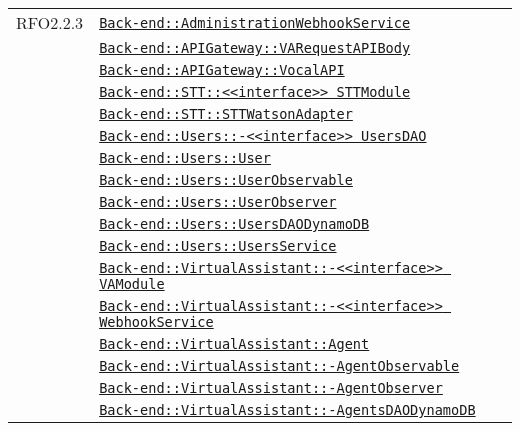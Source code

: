 \begin{longtable}{|>{\centering}m{3cm}|m{10cm}<{\centering}|}
RFO2.2.3 & \hyperref[Back-end::AdministrationWebhookService]{\texttt{Back-end::AdministrationWebhookService}}\\
& \hyperref[Back-end::APIGateway::VARequestAPIBody]{\texttt{Back-end::APIGateway::VARequestAPIBody}}\\
& \hyperref[Back-end::APIGateway::VocalAPI]{\texttt{Back-end::APIGateway::VocalAPI}}\\
& \hyperref[Back-end::STT::<<interface>> STTModule]{\texttt{Back-end::STT::<<interface>> STTModule}}\\
& \hyperref[Back-end::STT::STTWatsonAdapter]{\texttt{Back-end::STT::STTWatsonAdapter}}\\
& \hyperref[Back-end::Users::<<interface>> UsersDAO]{\texttt{Back-end::Users::-\linebreak <<interface>> UsersDAO}}\\
& \hyperref[Back-end::Users::User]{\texttt{Back-end::Users::User}}\\
& \hyperref[Back-end::Users::UserObservable]{\texttt{Back-end::Users::UserObservable}}\\
& \hyperref[Back-end::Users::UserObserver]{\texttt{Back-end::Users::UserObserver}}\\
& \hyperref[Back-end::Users::UsersDAODynamoDB]{\texttt{Back-end::Users::UsersDAODynamoDB}}\\
& \hyperref[Back-end::Users::UsersService]{\texttt{Back-end::Users::UsersService}}\\
& \hyperref[Back-end::VirtualAssistant::<<interface>> VAModule]{\texttt{Back-end::VirtualAssistant::-\linebreak <<interface>> VAModule}}\\
& \hyperref[Back-end::VirtualAssistant::<<interface>> WebhookService]{\texttt{Back-end::VirtualAssistant::-\linebreak <<interface>> WebhookService}}\\
& \hyperref[Back-end::VirtualAssistant::Agent]{\texttt{Back-end::VirtualAssistant::Agent}}\\
& \hyperref[Back-end::VirtualAssistant::AgentObservable]{\texttt{Back-end::VirtualAssistant::-\linebreak AgentObservable}}\\
& \hyperref[Back-end::VirtualAssistant::AgentObserver]{\texttt{Back-end::VirtualAssistant::-\linebreak AgentObserver}}\\
& \hyperref[Back-end::VirtualAssistant::AgentsDAODynamoDB]{\texttt{Back-end::VirtualAssistant::-\linebreak AgentsDAODynamoDB}}\\

\end{longtable}
